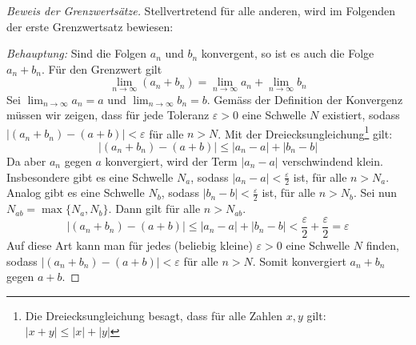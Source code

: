 \newpage
\begin{proof}[Beweis der Grenzwertsätze]
	Stellvertretend für alle anderen, wird im Folgenden der erste Grenzwertsatz bewiesen:

	\emph{Behauptung:} Sind die Folgen $a_n$ und $b_n$ konvergent, so ist es auch die Folge $a_n + b_n$.  Für den Grenzwert gilt
	$$\lim_{n\rightarrow \infty} \left(a_n + b_n \right) = \lim_{n\rightarrow \infty} a_n + \lim_{n\rightarrow \infty} b_n $$
	Sei $\lim_{n\rightarrow \infty} a_n = a$ und $ \lim_{n\rightarrow \infty} b_n = b$.
	Gemäss der Definition der Konvergenz müssen wir zeigen, dass für jede Toleranz $\varepsilon>0$ eine Schwelle $N$ existiert, sodass $|(a_n+b_n )-(a+b)|<\varepsilon$ für alle $n>N$. Mit der Dreiecksungleichung\footnote{Die Dreiecksungleichung besagt, dass für alle Zahlen $x,y$ gilt: $|x+y|\le |x|+|y|$} gilt:
	$$|(a_n+b_n)-(a+b)|\le |a_n - a|+|b_n - b|$$
	Da aber $a_n$ gegen $a$ konvergiert, wird der Term $|a_n-a|$ verschwindend klein. Insbesondere gibt es eine Schwelle $N_a$, sodass $|a_n-a|<\frac{\varepsilon}{2}$ ist, für alle $n>N_a$.\newline
	Analog gibt es eine Schwelle $N_b$, sodass $|b_n-b|<\frac{\varepsilon}{2}$ ist, für alle $n>N_b$. \newline
	Sei nun $N_{ab} = \max \{N_a, N_b\}$. Dann gilt für alle $n>N_{ab}$.
	$$|(a_n+b_n )-(a+b)|\le |a_n-a|+|b_n-b|<\frac{\varepsilon}{2}+\frac{\varepsilon}{2}= \varepsilon$$
	Auf diese Art kann man für jedes (beliebig kleine) $\varepsilon>0$ eine Schwelle $N$ finden, sodass $|(a_n+b_n )-(a+b)|<\varepsilon$ für alle $n>N$. Somit konvergiert $a_n+b_n$ gegen $a+b$.
\end{proof}
